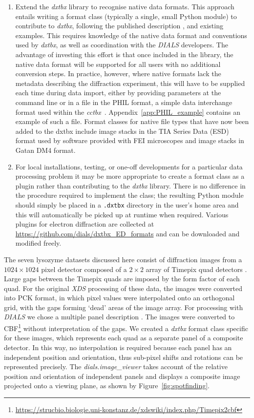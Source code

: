 \documentclass[preprint]{iucr}
\newcommand{\cctbx}{\emph{cctbx}\xspace}
\newcommand{\dxtbx}{\emph{dxtbx}\xspace}
\newcommand{\dials}{\emph{DIALS}\xspace}
\newcommand{\dialsimageviewer}{\emph{dials.image\_viewer}\xspace}
\newcommand{\code}{\texttt}
\newcommand{\xds}{\emph{XDS}\xspace}
\begin{document}
\begin{enumerate}
  \item Extend the \dxtbx library to recognise native data formats. This
  approach entails writing a format class (typically a single, small Python
  module) to contribute to \dxtbx, following the published description
  \cite{Parkhurst2014}, and existing examples. This requires knowledge of the
  native data format and conventions used by \dxtbx, as well as coordination
  with the \dials developers. The advantage of investing this effort is that
  once included in the library, the native data format will be supported for
  all users with no additional conversion steps. In practice, however, where
  native formats lack the metadata describing the diffraction experiment, this
  will have to be supplied each time during data import, either by providing
  parameters at the command line or in a file in the PHIL format, a simple data
  interchange format used within the \cctbx~\cite{Grosse-Kunstleve2002}.
  Appendix~\ref{app:PHIL_example} contains an example of such a file. Format
  classes for native file types that have now been added to the dxtbx include
  image stacks in the TIA Series Data (ESD) format used by software provided
  with FEI microscopes and image stacks in Gatan DM4 format.

  \item For local installations, testing, or one-off developments for a
  particular data processing problem it may be more appropriate to create a
  format class as a plugin rather than contributing to the \dxtbx library.
  There is no difference in the procedure required to implement the class; the
  resulting Python module should simply be placed in a \code{.dxtbx} directory
  in the user's home area and this will automatically be picked up at runtime
  when required. Various plugins for electron diffraction are collected at
  \url{https://github.com/dials/dxtbx_ED_formats} and can be downloaded and
  modified freely.

\end{enumerate}

The seven lysozyme datasets discussed here consist of diffraction images from a
$1024\times1024$ pixel detector composed of a $2\times2$ array of Timepix quad detectors
\cite{Clabbers2017}. Large gaps between the Timepix quads are imposed by the
form factor of each quad. For the original \xds processing of these data, the
images were converted into PCK format, in which pixel values were interpolated
onto an orthogonal grid, with the gaps forming `dead' areas of the image array.
For processing with \dials we chose a multiple panel description
\cite{Parkhurst2014}. The images were converted to
CBF\footnote{\url{https://strucbio.biologie.uni-konstanz.de/xdswiki/index.php/Timepix2cbf}}
without interpretation of the gaps. We created a \dxtbx format class specific
for these images, which represents each quad as a separate panel of a composite
detector. In this way, no interpolation is required because each panel has an
independent position and orientation, thus sub-pixel shifts and rotations can be
represented precisely. The \dialsimageviewer takes account of the relative
position and orientation of independent panels and displays a composite image
projected onto a viewing plane, as shown by
Figure~\ref{fig:spotfinding}.
\end{document}
